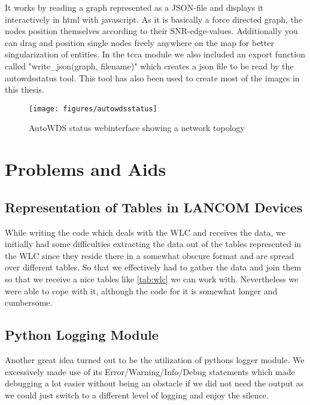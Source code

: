    It works by reading a graph represented as a \ac{JSON}-file and displays it interactively in html with javascript.
    As it is basically a force directed graph, the nodes position themselves according to their SNR-edge-values. 
    Additionally you can drag and position single nodes freely anywhere on the map for better singularization of entities.
    In the tcca module we also included an export function called "write\_json(graph, filename)" which creates a json file to be read by the autowdsstatus tool.
    This tool has also been used to create most of the images in this thesis.
    
    \begin{figure}[t]
      \centering
      \texttt{[image: figures/autowdsstatus]}
      \caption{AutoWDS status webinterface showing a network topology}
      \label{fig:autowdsstatus}
    \end{figure}
    
  \section{Problems and Aids}
  
    \subsection{Representation of Tables in LANCOM Devices}
      While writing the code which deals with the WLC and receives the data, we initially had some difficulties extracting the data out of the tables represented in the WLC since
      they reside there in a somewhat obscure format and are spread over different tables. So that we effectively had to gather the data and join them so that we receive a
      nice tables like \ref{tab:wlc} we can work with. Nevertheless we were able to cope with it, although the code for it is somewhat longer and cumbersome.
      
    \subsection{Python Logging Module}
      Another great idea turned out to be the utilization of pythons logger module. We excessively made use of its Error/Warning/Info/Debug statements which made debugging
      a lot easier without being an obstacle if we did not need the output as we could just switch to a different level of logging and enjoy the silence.
  
